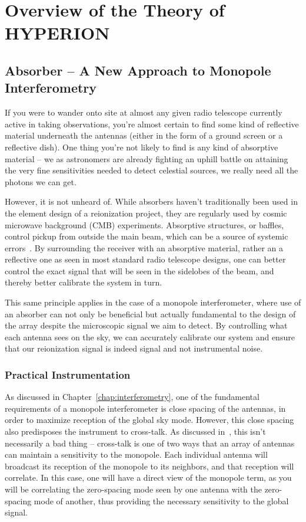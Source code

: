 \chapter{Overview of the Theory of HYPERION}

\section{Absorber -- A New Approach to Monopole Interferometry}

If you were to wander onto site at almost any given radio telescope currently 
active in taking observations, you're almost certain to find some kind of 
reflective material underneath the antennas (either in the form of a ground 
screen or a reflective dish). One thing you're not likely to find is any kind 
of absorptive material -- we as astronomers are already fighting an uphill 
battle on attaining the very fine sensitivities needed to detect celestial 
sources, we really need all the photons we can get. 

However, it is not unheard of. While absorbers haven't traditionally been used 
in the element design of a reionization project, they are regularly used by 
cosmic microwave background (CMB) experiments. Absorptive structures, or 
baffles, control pickup from outside the main beam, which can be a source of 
systemic errors~\citep{essinger-hileman2016}. By surrounding the receiver with 
an absorptive material, rather an a reflective one as seen in most standard 
radio telescope designs, one can better control the exact signal that will be 
seen in the sidelobes of the beam, and thereby better calibrate the system in 
turn.

This same principle applies in the case of a monopole interferometer, where use 
of an absorber can not only be beneficial but actually fundamental to the 
design of the array despite the microscopic signal we aim to detect. By 
controlling what each antenna sees on the sky, we can accurately calibrate our 
system and ensure that our reionization signal is indeed signal and not 
instrumental noise. 

\subsection{Practical Instrumentation}

As discussed in Chapter~\ref{chap:interferometry}, one of the fundamental 
requirements of a monopole interferometer is close spacing of the antennas, in 
order to maximize reception of the global sky mode. However, this close spacing 
also predisposes the instrument to cross-talk. As discussed 
in~\citet{venumadhav2016}, this isn't necessarily a bad thing -- cross-talk is 
one of two ways that an array of antennas can maintain a sensitivity to the 
monopole. Each individual antenna will broadcast its reception of the monopole 
to its neighbors, and that reception will correlate. In this case, one will 
have a direct view of the monopole term, as you will be correlating the 
zero-spacing mode seen by one antenna with the zero-spacing mode of another, 
thus providing the necessary sensitivity to the global signal. 

